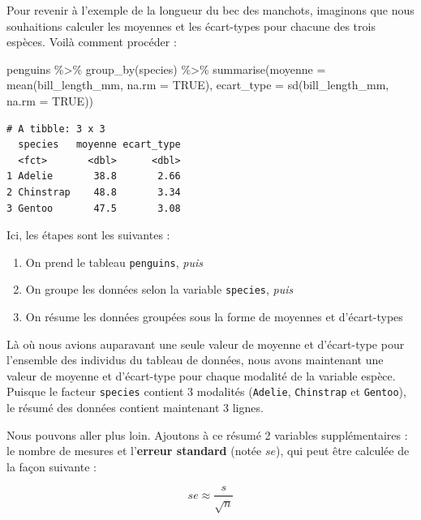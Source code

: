 \documentclass[
  a4paper,
  DIV=11,
  numbers=noendperiod,
  oneside]{scrreprt}
\newenvironment{Shaded}{}{}
\newcommand{\AttributeTok}[1]{\textcolor[rgb]{0.84,0.23,0.29}{#1}}
\newcommand{\ConstantTok}[1]{\textcolor[rgb]{0.00,0.36,0.77}{#1}}
\newcommand{\FunctionTok}[1]{\textcolor[rgb]{0.44,0.26,0.76}{#1}}
\newcommand{\NormalTok}[1]{\textcolor[rgb]{0.14,0.16,0.18}{#1}}
\newcommand{\SpecialCharTok}[1]{\textcolor[rgb]{0.00,0.36,0.77}{#1}}
\providecommand{\tightlist}{%
  \setlength{\itemsep}{0pt}\setlength{\parskip}{0pt}}\usepackage{longtable,booktabs,array}
\begin{document}
Pour revenir à l'exemple de la longueur du bec des manchots, imaginons
que nous souhaitions calculer les moyennes et les écart-types pour
chacune des trois espèces. Voilà comment procéder :

\begin{Shaded}
\begin{Highlighting}[]
\NormalTok{penguins }\SpecialCharTok{\%\textgreater{}\%}
  \FunctionTok{group\_by}\NormalTok{(species) }\SpecialCharTok{\%\textgreater{}\%}
  \FunctionTok{summarise}\NormalTok{(}\AttributeTok{moyenne =} \FunctionTok{mean}\NormalTok{(bill\_length\_mm, }\AttributeTok{na.rm =} \ConstantTok{TRUE}\NormalTok{),}
            \AttributeTok{ecart\_type =} \FunctionTok{sd}\NormalTok{(bill\_length\_mm, }\AttributeTok{na.rm =} \ConstantTok{TRUE}\NormalTok{))}
\end{Highlighting}
\end{Shaded}

\begin{verbatim}
# A tibble: 3 x 3
  species   moyenne ecart_type
  <fct>       <dbl>      <dbl>
1 Adelie       38.8       2.66
2 Chinstrap    48.8       3.34
3 Gentoo       47.5       3.08
\end{verbatim}

Ici, les étapes sont les suivantes :

\begin{enumerate}
\def\labelenumi{\arabic{enumi}.}
\tightlist
\item
  On prend le tableau \texttt{penguins}, \emph{puis}
\item
  On groupe les données selon la variable \texttt{species}, \emph{puis}
\item
  On résume les données groupées sous la forme de moyennes et
  d'écart-types
\end{enumerate}

Là où nous avions auparavant une seule valeur de moyenne et d'écart-type
pour l'ensemble des individus du tableau de données, nous avons
maintenant une valeur de moyenne et d'écart-type pour chaque modalité de
la variable espèce. Puisque le facteur \texttt{species} contient 3
modalités (\texttt{Adelie}, \texttt{Chinstrap} et \texttt{Gentoo}), le
résumé des données contient maintenant 3 lignes.

Nous pouvons aller plus loin. Ajoutons à ce résumé 2 variables
supplémentaires : le nombre de mesures et l'\textbf{erreur standard}
(notée \(se\)), qui peut être calculée de la façon suivante :

\[se \approx \frac{s}{\sqrt{n}}\]
\end{document}
